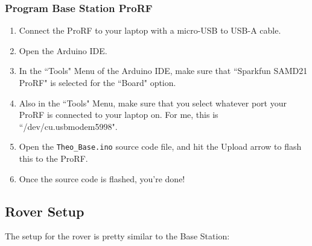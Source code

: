 \documentclass{article}%
\begin{document}
\subsubsection{Program Base Station ProRF}
\begin{enumerate}
	\item Connect the ProRF to your laptop with a micro-USB to USB-A cable.
	\item Open the Arduino IDE.
	\item In the ``Tools" Menu of the Arduino IDE, make sure that ``Sparkfun SAMD21 ProRF" is selected for the ``Board" option.
	\item Also in the ``Tools" Menu, make sure that you select whatever port your ProRF is connected to your laptop on.  For me, this is ``/dev/cu.usbmodem5998".
	\item Open the \texttt{Theo\_Base.ino} source code file, and hit the Upload arrow to flash this to the ProRF.
	\item Once the source code is flashed, you're done!
\end{enumerate}

\subsection{Rover Setup}
The setup for the rover is pretty similar to the Base Station:
\end{document}
